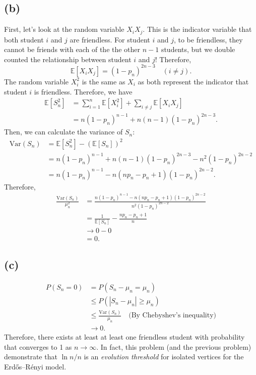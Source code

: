 \subsection*{(b)}
First, let's look at the random variable $X_i X_j$. This is the indicator variable that both student $i$ and $j$ 
are friendless. For student $i$ and $j$, to be friendless, they cannot be friends with each of the the other 
$n - 1$ students, but we double counted the relationship between student $i$ and $j$! Therefore, 
\[ \mathbb{E}\left[ X_i X_j \right] = (1 - p_n)^{2n - 3} \quad (i \neq j). \]
The random variable $X_i^2$ is the same as $X_i$ as both represent the indicator that student $i$ is friendless. 
Therefore, we have 
\begin{align*}
	\mathbb{E}\left[ S_n^2 \right] 
	&= \sum_{i = 1}^{n} \mathbb{E}\left[ X_i^2 \right] + \sum_{i \neq j}^{} \mathbb{E}\left[ X_iX_j \right] \\
	&= n(1 - p_n)^{n - 1} + n(n - 1)(1 - p_n)^{2n - 3}.
\end{align*}
Then, we can calculate the variance of $S_n$:
\begin{align*}
	\mathrm{Var}(S_n) 
	&= \mathbb{E}\left[ S_n^2 \right] - (\mathbb{E}\left[ S_n \right])^2 \\
	&= n(1 - p_n)^{n - 1} + n(n - 1)(1 - p_n)^{2n - 3} - n^2 (1 - p_n)^{2n - 2} \\
	&= n(1 - p_n)^{n - 1} - n(np_n - p_n + 1)(1 - p_n)^{2n - 2}.
\end{align*}
Therefore, 
\begin{align*}
	\frac{\mathrm{Var}(S_n)}{\mu_n^2} 
	&= \frac{n(1 - p_n)^{n - 1} - n(np_n - p_n + 1)(1 - p_n)^{2n - 2}}{n^2 (1 - p_n)^{2n - 2}} \\
	&= \frac{1}{\mathbb{E}\left[ S_n \right]} - \frac{np_n - p_n + 1}{n} \\
	&\to 0 - 0 \\
	&= 0.
\end{align*}

\subsection*{(c)}
\begin{align*}
	P(S_n = 0) 
	&= P(S_n - \mu_n = \mu_n) \\
	&\leq P(|S_n - \mu_n| \geq \mu_n) \\
	&\leq \frac{\mathrm{Var}(S_n)}{\mu_n} \quad \text{(By Chebyshev's inequality)} \\
	&\to 0.
\end{align*}
Therefore, there exists at least at least one friendless student with probability that converges to 1 as 
$n \to \infty$. In fact, this problem (and the previous problem) demonstrate that $\ln{n}/n$ is an 
\textit{evolution threshold} for isolated vertices for the Erdős–Rényi model.


